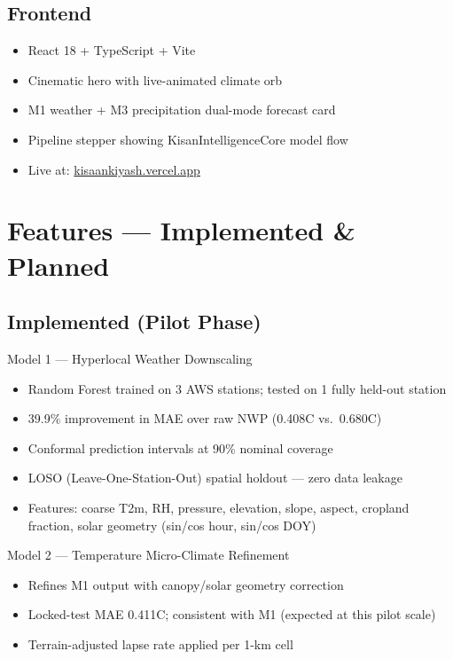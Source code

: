 \documentclass[12pt,a4paper]{article}
\begin{document}
\subsection{Frontend}

\begin{itemize}[leftmargin=*]
  \item React 18 + TypeScript + Vite
  \item Cinematic hero with live-animated climate orb
  \item M1 weather + M3 precipitation dual-mode forecast card
  \item Pipeline stepper showing KisanIntelligenceCore model flow
  \item Live at: \href{https://kisaankiyash.vercel.app}{kisaankiyash.vercel.app}
\end{itemize}

\section{Features --- Implemented \& Planned}

\subsection{Implemented (Pilot Phase)}

\begin{kpibox}{Model 1 --- Hyperlocal Weather Downscaling}
\begin{itemize}[leftmargin=*,noitemsep]
  \item Random Forest trained on 3 AWS stations; tested on 1 fully held-out station
  \item 39.9\% improvement in MAE over raw NWP (0.408\textdegree C vs.\ 0.680\textdegree C)
  \item Conformal prediction intervals at 90\% nominal coverage
  \item LOSO (Leave-One-Station-Out) spatial holdout --- zero data leakage
  \item Features: coarse T2m, RH, pressure, elevation, slope, aspect, cropland fraction, solar geometry (sin/cos hour, sin/cos DOY)
\end{itemize}
\end{kpibox}

\begin{kpibox}{Model 2 --- Temperature Micro-Climate Refinement}
\begin{itemize}[leftmargin=*,noitemsep]
  \item Refines M1 output with canopy/solar geometry correction
  \item Locked-test MAE 0.411\textdegree C; consistent with M1 (expected at this pilot scale)
  \item Terrain-adjusted lapse rate applied per 1-km cell
\end{itemize}
\end{kpibox}
\end{document}
